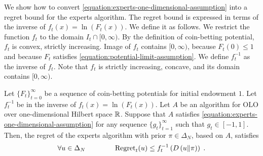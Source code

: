 We show how to convert \eqref{equation:experts-one-dimensional-assumption} into
a regret bound for the experts algorithm. The regret bound is expressed in terms
of the inverse of $f_t(x) = \ln(F_t(x))$. We define it as follows. We
restrict the function $f_t$ to the domain $I_t \cap [0, \infty)$. By the
definition of coin-betting potential, $f_t$ is convex, strictly increasing.
Image of $f_t$ contains $[0,\infty)$, because $F_t(0) \le 1$ and because $F_t$
satisfies \eqref{equation:potential-limit-assumption}. We define $f_t^{-1}$ as
the inverse of $f_t$. Note that $f_t$ is strictly increasing, concave, and its
domain contains $[0, \infty)$.

\begin{theorem}
\label{theorem:regret-bound-experts}
Let $\{F_t\}_{t=0}^\infty$ be a sequence of coin-betting potentials for initial
endowment $1$. Let $f_t^{-1}$ be in the inverse of $f_t(x) = \ln(F_t(x))$.
Let $A$ be an algorithm for OLO over one-dimensional Hilbert space
$\mathbb{R}$. Suppose that $A$ satisfies
\eqref{equation:experts-one-dimensional-assumption} for any sequence
$\{g_t\}_{t=1}^\infty$ such that $g_t \in [-1,1]$. Then, the regret of the
experts algorithm with prior $\pi \in \Delta_N$, based on $A$, satisfies
$$
\forall u \in \Delta_N \qquad \qquad
\operatorname{Regret}_t(u) \le f_t^{-1}\left( D\left({u}\middle\|{\pi}\right) \right) \; .
$$
\end{theorem}

